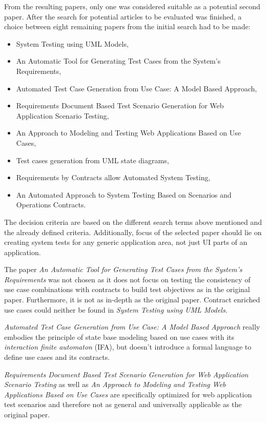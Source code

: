From the resulting papers, only one was considered suitable as a potential second paper. After the search for potential articles to be evaluated was finished, a choice between eight remaining papers from the initial search had to be made:

\begin{itemize}
	\item System Testing using UML Models,
	\item An Automatic Tool for Generating Test Cases from the System's Requirements,
	\item Automated Test Case Generation from Use Case: A Model Based Approach,
	\item Requirements Document Based Test Scenario Generation for Web Application Scenario Testing,
	\item An Approach to Modeling and Testing Web Applications Based on Use Cases,
	\item Test cases generation from UML state diagrams,
	\item Requirements by Contracts allow Automated System Testing,
	\item An Automated Approach to System Testing Based on Scenarios and Operations Contracts.
\end{itemize}

The decision criteria are based on the different search terms above mentioned and the already defined criteria. Additionally, focus of the selected paper should lie on creating system tests for any generic application area, not just UI parts of an application.

The paper \textit{An Automatic Tool for Generating Test Cases from the System's Requirements} was not chosen as it does not focus on testing the consistency of use case combinations with contracts to build test objectives as in the original paper. Furthermore, it is not as in-depth as the original paper. Contract enriched use cases could neither be found in \textit{System Testing using UML Models}.

\textit{Automated Test Case Generation from Use Case: A Model Based Approach} really embodies the principle of state base modeling based on use cases with its \textit{interaction finite automaton} (IFA), but doesn't introduce a formal language to define use cases and its contracts.

\textit{Requirements Document Based Test Scenario Generation for Web Application Scenario Testing} as well as \textit{An Approach to Modeling and Testing Web Applications Based on Use Cases} are specifically optimized for web application test scenarios and therefore not as general and universally applicable as the original paper.

